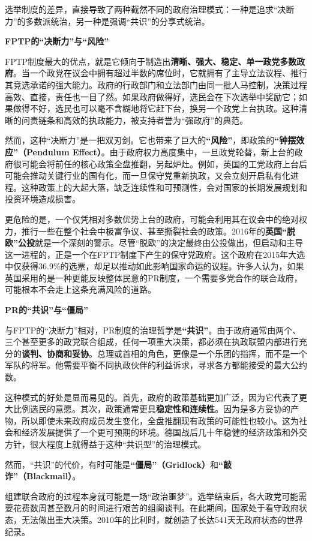 选举制度的差异，直接导致了两种截然不同的政府治理模式：一种是追求“决断力”的多数派统治，另一种是强调“共识”的分享式统治。

\textbf{FPTP的“决断力”与“风险”}

FPTP制度最大的优点，就是它倾向于制造出\textbf{清晰、强大、稳定、单一政党多数政府}。当一个政党在议会中拥有超过半数的席位时，它就拥有了主导立法议程、推行其竞选承诺的强大能力。政府的行政部门和立法部门由同一批人马控制，决策过程高效、直接，责任也一目了然。如果政府做得好，选民会在下次选举中奖励它；如果做得不好，选民也可以毫不含糊地将它赶下台，换另一个政党上台执政。这种清晰的问责链条和高效的执政能力，被支持者誉为“强政府”的典范。

然而，这种“决断力”是一把双刃剑。它也带来了巨大的\textbf{“风险”}，即政策的\textbf{“钟摆效应”（Pendulum Effect）}。由于政府权力高度集中，一旦政党轮替，新上台的政府很可能会将前任的核心政策全盘推翻，另起炉灶。例如，英国的工党政府上台后可能会推动关键行业的国有化，而一旦保守党重新执政，又会立刻开启私有化进程。这种政策上的大起大落，缺乏连续性和可预测性，会对国家的长期发展规划和投资环境造成损害。

更危险的是，一个仅凭相对多数优势上台的政府，可能会利用其在议会中的绝对权力，推行一些在整个社会中极富争议、甚至撕裂社会的政策。2016年的\textbf{英国“脱欧”公投}就是一个深刻的警示。尽管“脱欧”的决定最终由公投做出，但启动和主导这一进程的，正是一个在FPTP制度下产生的保守党政府。这个政府在2015年大选中仅获得36.9\%的选票，却足以推动如此影响国家命运的议程。许多人认为，如果英国采用的是一种更能反映整体民意的PR制度，一个需要多党合作的联合政府，可能根本不会走上这条充满风险的道路。

\textbf{PR的“共识”与“僵局”}

与FPTP的“决断力”相对，PR制度的治理哲学是\textbf{“共识”}。由于政府通常由两个、三个甚至更多的政党联合组成，任何一项重大决策，都必须在执政联盟内部进行充分的\textbf{谈判、协商和妥协}。总理或首相的角色，更像是一个乐团的指挥，而不是一个军队的将军。他需要平衡不同执政伙伴的利益诉求，寻求各方都能接受的最大公约数。

这种模式的好处是显而易见的。首先，政府的政策基础更加广泛，因为它代表了更大比例选民的意愿。其次，政策通常更具\textbf{稳定性和连续性}。因为是多方妥协的产物，所以即使未来政府成员发生变化，全盘推翻现有政策的可能性也较小。这为社会和经济发展提供了一个更可预期的环境。德国战后几十年稳健的经济政策和外交方针，很大程度上就得益于这种“共识型”的治理模式。

然而，“共识”的代价，有时可能是\textbf{“僵局”（Gridlock）}和\textbf{“敲诈”（Blackmail）}。

组建联合政府的过程本身就可能是一场“政治噩梦”。选举结束后，各大政党可能需要花费数周甚至数月的时间进行艰苦的组阁谈判。在此期间，国家处于看守政府状态，无法做出重大决策。2010年的比利时，就创造了长达541天无政府状态的世界纪录。

